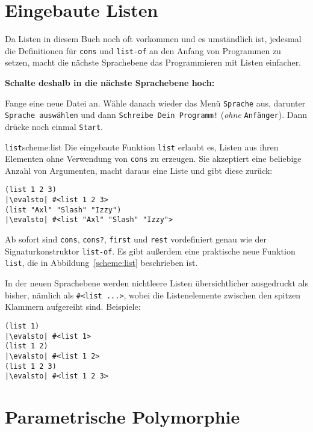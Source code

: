 \section{Eingebaute Listen}

Da Listen in diesem Buch noch oft vorkommen und es umständlich ist,
jedesmal die Definitionen für \lstinline{cons} und \lstinline{list-of} an
den Anfang von Programmen zu setzen, macht die nächste Sprachebene das
Programmieren mit Listen einfacher.

\noindent\textbf{Schalte deshalb in die nächste Sprachebene hoch:}

\noindent Fange eine neue Datei an.  Wähle danach wieder das Menü
\texttt{Sprache} aus, darunter \texttt{Sprache auswählen} und dann
\texttt{Schreibe Dein Programm!} (\emph{ohne} \texttt{Anfänger}).
Dann drücke noch einmal \texttt{Start}.

\begin{feature}{\texttt{list}}{scheme:list}
  Die eingebaute Funktion \lstinline{list} erlaubt es, Listen aus ihren Elementen
  ohne Verwendung von \lstinline{cons} zu erzeugen.  Sie
  akzeptiert eine beliebige Anzahl von Argumenten, macht daraus eine
  Liste und gibt diese zurück:
%
\begin{lstlisting}
(list 1 2 3)
|\evalsto| #<list 1 2 3>
(list "Axl" "Slash" "Izzy")
|\evalsto| #<list "Axl" "Slash" "Izzy">
\end{lstlisting}
\end{feature}

Ab sofort sind \lstinline{cons}, \lstinline{cons?}, \lstinline{first} und
\lstinline{rest} vordefiniert genau wie der Signaturkonstruktor
\lstinline{list-of}.  Es gibt außerdem eine praktische neue Funktion
\lstinline{list}, die in Abbildung~\ref{scheme:list} beschrieben ist.

In der neuen Sprachebene werden nichtleere Listen übersichtlicher ausgedruckt
als bisher, nämlich als
\lstinline{#<list ...>}, wobei die Listenelemente zwischen den spitzen
Klammern aufgereiht sind.  Beispiele:
%
\begin{lstlisting}
(list 1)
|\evalsto| #<list 1>
(list 1 2)
|\evalsto| #<list 1 2>
(list 1 2 3)
|\evalsto| #<list 1 2 3>
\end{lstlisting}
%

\section{Parametrische Polymorphie}
\label{sec:parametric-polymorphism}
\label{sec:more-lists}


